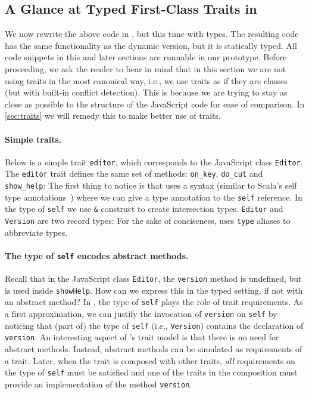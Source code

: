 \subsection{A Glance at Typed First-Class Traits in \sedel}

We now rewrite the above code in \sedel, but this time with types. The resulting code has the same functionality as the dynamic version, but it is
statically typed. All code snippets in this and later sections are runnable in
our prototype. Before proceeding, we ask the reader to bear in mind that in this section we are not using traits
in the most canonical way, i.e., we use traits as if they are classes (but with
built-in conflict detection). This is because we are trying to stay as close as possible
to the structure of the JavaScript code for ease of comparison. In
\cref{sec:traits} we will remedy this to make better use of traits.

\paragraph{Simple traits.}
Below is a simple trait \lstinline{editor}, which corresponds to the JavaScript
class \lstinline{Editor}. The \lstinline{editor} trait defines the same set of
methods: \lstinline{on_key}, \lstinline{do_cut} and \lstinline{show_help}:
The first thing to notice is that \sedel uses a syntax (similar to Scala's
self type annotations~\citep{odersky2004overview}) where we can give a type annotation to the
\lstinline{self} reference. In the type of \lstinline{self} we use
\lstinline{&} construct to create intersection types. \lstinline{Editor} and \lstinline{Version} are two record types:
For the sake of conciseness, \sedel uses \lstinline{type} aliases to abbreviate types.

\paragraph{The type of \lstinline{self} encodes abstract methods.}
Recall that in the JavaScript class \lstinline{Editor}, the \lstinline{version}
method is undefined, but is used inside \lstinline{showHelp}. How can we express
this in the typed setting, if not with an abstract method? In \sedel, the type of \lstinline{self}
plays the role of trait requirements. As a first approximation, we
can justify the invocation of \lstinline{version} on \lstinline{self} by noticing that (part of) the
type of \lstinline{self} (i.e., \lstinline{Version}) contains the declaration of
\lstinline{version}. An interesting aspect of \sedel's trait model is that there
is no need for abstract methods. Instead, abstract methods can be simulated as
requirements of a trait. Later, when the trait is composed with other
traits, \emph{all} requirements on the type of \lstinline{self} must be
satisfied and one of the traits in the composition must provide an
implementation of the method \lstinline{version}.


